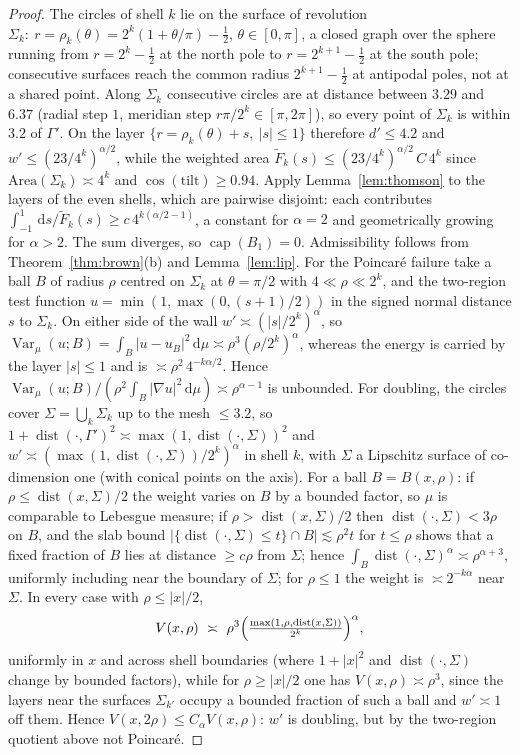 \documentclass[11pt]{amsart}
\newcommand{\dd}{\,\mathrm{d}}
\newcommand{\abs}[1]{\lvert #1\rvert}
\DeclareMathOperator{\capa}{cap}
\DeclareMathOperator{\dist}{dist}
\DeclareMathOperator{\Var}{Var}
\theoremstyle{plain}
\theoremstyle{definition}
\theoremstyle{remark}
\begin{document}
\begin{proof}
The circles of shell $k$ lie on the surface of revolution
$\Sigma_k:\ r=\rho_k(\theta)=2^k(1+\theta/\pi)-\tfrac12$, $\theta\in[0,\pi]$, a
closed graph over the sphere running from $r=2^k-\frac12$ at the north pole to
$r=2^{k+1}-\frac12$ at the south pole; consecutive surfaces reach the common
radius $2^{k+1}-\frac12$ at antipodal poles, not at a shared point. Along
$\Sigma_k$ consecutive circles are at distance between $3.29$ and $6.37$ (radial
step $1$, meridian step $r\pi/2^k\in[\pi,2\pi]$), so every point of $\Sigma_k$ is
within $3.2$ of $\Gamma'$. On the layer $\{r=\rho_k(\theta)+s,\ \abs s\le1\}$
therefore $d'\le4.2$ and $w'\le(23/4^k)^{\alpha/2}$, while the weighted area
$\tilde F_k(s)\le(23/4^k)^{\alpha/2}\,C\,4^k$ since $\mathrm{Area}(\Sigma_k)\asymp4^k$
and $\cos(\mathrm{tilt})\ge0.94$. Apply Lemma~\ref{lem:thomson} to the layers of
the even shells, which are pairwise disjoint: each contributes
$\int_{-1}^1\dd s/\tilde F_k(s)\ge c\,4^{k(\alpha/2-1)}$, a constant for $\alpha=2$
and geometrically growing for $\alpha>2$. The sum diverges, so $\capa(B_1)=0$.
Admissibility follows from Theorem~\ref{thm:brown}(b) and Lemma~\ref{lem:lip}.
For the Poincar\'e failure take a ball $B$ of radius $\rho$ centred on
$\Sigma_k$ at $\theta=\pi/2$ with $4\ll\rho\ll2^k$, and the two-region test
function $u=\min(1,\max(0,(s+1)/2))$ in the signed normal distance $s$ to
$\Sigma_k$. On either side of the wall $w'\asymp(\abs s/2^k)^\alpha$, so
$\Var_\mu(u;B)=\int_B\abs{u-u_B}^2\dd\mu\asymp\rho^3(\rho/2^k)^\alpha$, whereas the energy is carried by
the layer $\abs s\le1$ and is $\asymp\rho^2\,4^{-k\alpha/2}$. Hence
$\Var_\mu(u;B)/(\rho^2\int_B\abs{\nabla u}^2\dd\mu)\asymp\rho^{\alpha-1}$ is
unbounded. For doubling, the circles cover $\Sigma=\bigcup_k\Sigma_k$ up to the mesh $\le3.2$, so
$1+\dist(\cdot,\Gamma')^2\asymp\max(1,\dist(\cdot,\Sigma))^2$ and
$w'\asymp(\max(1,\dist(\cdot,\Sigma))/2^k)^\alpha$ in shell $k$, with $\Sigma$ a
Lipschitz surface of co-dimension one (with conical points on the axis). For a ball
$B=B(x,\rho)$: if $\rho\le\dist(x,\Sigma)/2$ the weight varies on $B$ by a
bounded factor, so $\mu$ is comparable to Lebesgue measure; if
$\rho>\dist(x,\Sigma)/2$ then $\dist(\cdot,\Sigma)<3\rho$ on $B$, and the slab
bound $\abs{\{\dist(\cdot,\Sigma)\le t\}\cap B}\lesssim\rho^2t$ for
$t\le\rho$ shows that a fixed fraction of $B$ lies at distance $\ge c\rho$
from $\Sigma$; hence $\int_B\dist(\cdot,\Sigma)^\alpha\asymp
\rho^{\alpha+3}$, uniformly including near the boundary of $\Sigma$; for
$\rho\le1$ the weight is $\asymp2^{-k\alpha}$ near $\Sigma$. In every case with
$\rho\le\abs x/2$,
\[
V(x,\rho)\ \asymp\ \rho^3\Bigl(\tfrac{\max(1,\rho,\dist(x,\Sigma))}{2^k}\Bigr)^\alpha,
\]
uniformly in $x$ and across shell boundaries (where $1+\abs x^2$ and
$\dist(\cdot,\Sigma)$ change by bounded factors), while for $\rho\ge\abs x/2$ one
has $V(x,\rho)\asymp\rho^3$, since the layers near the surfaces $\Sigma_{k'}$
occupy a bounded fraction of such a ball and $w'\asymp1$ off them. Hence
$V(x,2\rho)\le C_\alpha V(x,\rho)$: $w'$ is doubling, but by the two-region
quotient above not Poincar\'e.
\end{proof}
\end{document}
